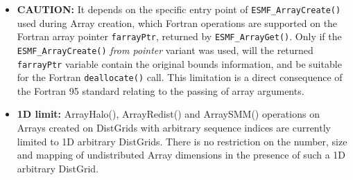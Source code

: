 
\begin{itemize}
\label{Array:rest}

\item {\bf CAUTION:} It depends on the specific entry point of {\tt ESMF\_ArrayCreate()} used during Array creation, which Fortran operations are supported on the Fortran array pointer {\tt farrayPtr}, returned by {\tt ESMF\_ArrayGet()}. Only if the {\tt ESMF\_ArrayCreate()} {\em from pointer} variant was used, will the returned {\tt farrayPtr} variable contain the original bounds information, and be suitable for the Fortran {\tt deallocate()} call. This limitation is a direct consequence of the Fortran 95 standard relating to the passing of array arguments.

\item {\bf 1D limit:} ArrayHalo(), ArrayRedist() and ArraySMM() operations on Arrays created on DistGrids with arbitrary sequence indices are currently limited to 1D arbitrary DistGrids. There is no restriction on the number, size
and mapping of undistributed Array dimensions in the presence of such a 1D
arbitrary DistGrid.

\end{itemize}
